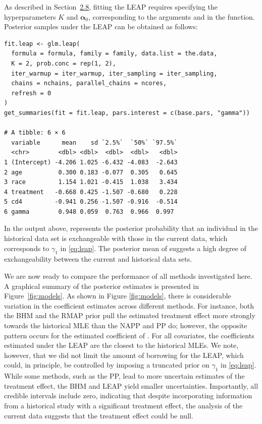 As described in Section~\hyperref[sec:LEAP]{2.8}, fitting the LEAP requires specifying the hyperparameters $K$ and $\bm{\alpha}_0$, corresponding to the arguments  and  in the  function. Posterior samples under the LEAP can be obtained as follows:
\begin{verbatim}
fit.leap <- glm.leap(
  formula = formula, family = family, data.list = the.data,
  K = 2, prob.conc = rep(1, 2),
  iter_warmup = iter_warmup, iter_sampling = iter_sampling,
  chains = nchains, parallel_chains = ncores,
  refresh = 0
)
get_summaries(fit = fit.leap, pars.interest = c(base.pars, "gamma"))

# A tibble: 6 × 6
  variable      mean    sd `2.5%`  `50%` `97.5%`
  <chr>        <dbl> <dbl>  <dbl>  <dbl>   <dbl>
1 (Intercept) -4.206 1.025 -6.432 -4.083  -2.643 
2 age          0.300 0.183 -0.077  0.305   0.645 
3 race         1.154 1.021 -0.415  1.038   3.434
4 treatment   -0.668 0.425 -1.507 -0.680   0.228
5 cd4         -0.941 0.256 -1.507 -0.916  -0.514 
6 gamma        0.948 0.059  0.763  0.966  0.997

\end{verbatim}
In the output above,  represents the posterior probability that an individual in the historical data set is exchangeable with those in the current data, which corresponds to $\gamma_1$ in \eqref{eq:leap}. The posterior mean of  suggests a high degree of exchangeability between the current and historical data sets.

We are now ready to compare the performance of all methods investigated here. A graphical summary of the posterior estimates is presented in Figure~\ref{fig:models}.
As shown in Figure \ref{fig:models}, there is considerable variation in the coefficient estimates across different methods.
For instance, both the BHM and the RMAP prior pull the estimated treatment effect more strongly towards the historical MLE than the NAPP and PP do; however, the opposite pattern occurs for the estimated coefficient of .
For all covariates, the coefficients estimated under the LEAP are the closest to the historical MLEs. We note, however, that we did not limit the amount of borrowing for the LEAP, which could, in principle, be controlled by imposing a truncated prior on $\gamma_1$ in \eqref{eq:leap}. While some methods, such as the PP, lead to more uncertain estimates of the treatment effect, the BHM and LEAP yield smaller uncertainties.
Importantly, all credible intervals include zero, indicating that despite incorporating information from a historical study with a significant treatment effect, the analysis of the current data suggests that the treatment effect could be null.

